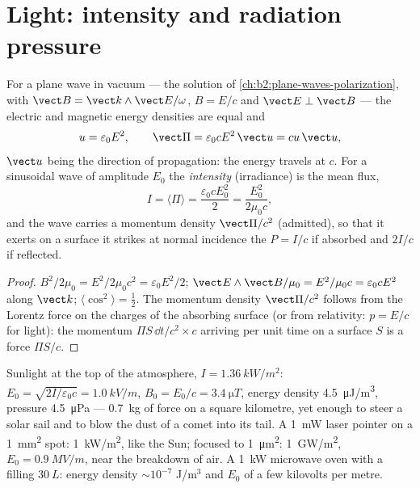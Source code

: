 \section{Light: intensity and radiation pressure}

\begin{proposition}\label{prop:b2:poynting-vector:wave}
For a plane wave in vacuum --- the solution of \cref{ch:b2:plane-waves-polarization},
with $\vect B = \vect k\wedge\vect E/\omega$, $B = E/c$ and $\vect E \perp \vect B$ ---
the electric and magnetic energy densities are equal and
\[
u = \varepsilon_0E^2 , \qquad \vect\Pi = \varepsilon_0cE^2\,\vect u = cu\,\vect u ,
\]
$\vect u$ being the direction of propagation: the energy travels at $c$.
For a sinusoidal wave of amplitude $E_0$ the \emph{intensity}
(irradiance) is the mean flux,
\[
I = \langle\Pi\rangle = \frac{\varepsilon_0cE_0^2}2 = \frac{E_0^2}{2\mu_0c} ,
\]
and the wave carries a momentum density $\vect\Pi/c^2$ (admitted), so
that it exerts on a surface it strikes at normal incidence the
\emph{} $P = I/c$ if absorbed and $2I/c$ if reflected.
\end{proposition}

\begin{proof}
$B^2/2\mu_0 = E^2/2\mu_0c^2 = \varepsilon_0E^2/2$; $\vect E\wedge\vect B/\mu_0 = E^2/\mu_0c =
\varepsilon_0cE^2$ along $\vect k$; $\langle\cos^2\rangle = \tfrac12$. The momentum
density $\vect\Pi/c^2$ follows from the Lorentz force on the charges of
the absorbing surface (or from relativity: $p = E/c$ for light): the
momentum $\Pi S\,\dd t/c^2\times c$ arriving per unit time on a surface $S$ is
a force $\Pi S/c$.
\end{proof}

\begin{example}\label{ex:b2:poynting-vector:orders}
Sunlight at the top of the atmosphere, $I = \qty{1.36}{kW/m^2}$: $E_0 =
\sqrt{2I/\varepsilon_0c} = \qty{1.0}{kV/m}$, $B_0 = E_0/c = \qty{3.4}{\micro T}$, energy
density \qty{4.5}{\micro J/m^3}, pressure \qty{4.5}{\micro Pa} --- \qty{0.7}{kg}
of force on a square kilometre, yet enough to steer a solar sail and to
blow the dust of a comet into its tail. A \qty{1}{mW} laser pointer on a
\qty{1}{mm^2} spot: \qty{1}{kW/m^2}, like the Sun; focused to \qty{1}{\micro m^2}:
\qty{1}{GW/m^2}, $E_0 = \qty{0.9}{MV/m}$, near the breakdown of air. A
\qty{1}{kW} microwave oven with a  filling $\qty{30}{L}$: energy
density $\sim 10^{-7}$ J/m$^3$ and $E_0$ of a few kilovolts per metre.
\end{example}

